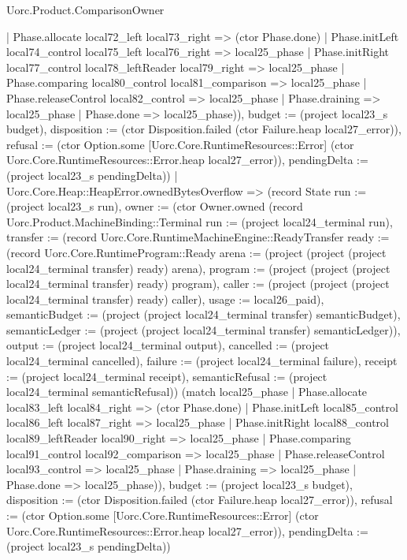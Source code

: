 \begin{lexlean}{Uorc.Product.ComparisonOwner}
\begin{semanticmodule}
{{      | Phase.allocate local72_left local73_right => (ctor Phase.done)
      | Phase.initLeft local74_control local75_left local76_right => local25_phase
      | Phase.initRight local77_control local78_leftReader local79_right => local25_phase
      | Phase.comparing local80_control local81_comparison => local25_phase
      | Phase.releaseControl local82_control => local25_phase
      | Phase.draining => local25_phase
      | Phase.done => local25_phase)), budget := (project local23_s budget), disposition := (ctor Disposition.failed (ctor Failure.heap local27_error)), refusal := (ctor Option.some [Uorc.Core.RuntimeResources::Error] (ctor Uorc.Core.RuntimeResources::Error.heap local27_error)), pendingDelta := (project local23_s pendingDelta)})
    | Uorc.Core.Heap::HeapError.ownedBytesOverflow => (record State {run := (project local23_s run), owner := (ctor Owner.owned (record Uorc.Product.MachineBinding::Terminal {run := (project local24_terminal run), transfer := (record Uorc.Core.RuntimeMachineEngine::ReadyTransfer {ready := (record Uorc.Core.RuntimeProgram::Ready {arena := (project (project (project local24_terminal transfer) ready) arena), program := (project (project (project local24_terminal transfer) ready) program), caller := (project (project (project local24_terminal transfer) ready) caller), usage := local26_paid}), semanticBudget := (project (project local24_terminal transfer) semanticBudget), semanticLedger := (project (project local24_terminal transfer) semanticLedger)}), output := (project local24_terminal output), cancelled := (project local24_terminal cancelled), failure := (project local24_terminal failure), receipt := (project local24_terminal receipt), semanticRefusal := (project local24_terminal semanticRefusal)}) (match local25_phase
      | Phase.allocate local83_left local84_right => (ctor Phase.done)
      | Phase.initLeft local85_control local86_left local87_right => local25_phase
      | Phase.initRight local88_control local89_leftReader local90_right => local25_phase
      | Phase.comparing local91_control local92_comparison => local25_phase
      | Phase.releaseControl local93_control => local25_phase
      | Phase.draining => local25_phase
      | Phase.done => local25_phase)), budget := (project local23_s budget), disposition := (ctor Disposition.failed (ctor Failure.heap local27_error)), refusal := (ctor Option.some [Uorc.Core.RuntimeResources::Error] (ctor Uorc.Core.RuntimeResources::Error.heap local27_error)), pendingDelta := (project local23_s pendingDelta)})
}
\end{semanticmodule}
\end{lexlean}
